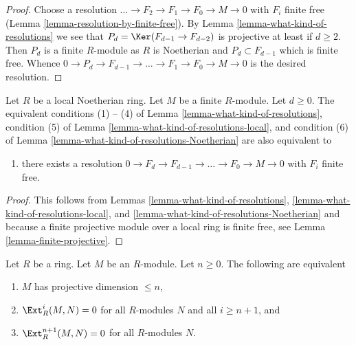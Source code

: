 \begin{proof}
Choose a resolution $\ldots \to F_2 \to F_1 \to F_0 \to M \to 0$
with $F_i$ finite free (Lemma \ref{lemma-resolution-by-finite-free}).
By Lemma \ref{lemma-what-kind-of-resolutions} we see that
$P_d = \Ker(F_{d - 1} \to F_{d - 2})$ is projective at least if $d \geq 2$.
Then $P_d$ is a finite $R$-module as $R$ is Noetherian and
$P_d \subset F_{d - 1}$ which is finite free.
Whence $0 \to P_d \to F_{d - 1} \to \ldots \to F_1 \to F_0 \to M \to 0$
is the desired resolution.
\end{proof}

\begin{lemma}
\label{lemma-what-kind-of-resolutions-Noetherian-local}
Let $R$ be a local Noetherian ring. Let $M$ be a finite $R$-module.
Let $d \geq 0$. The equivalent conditions (1) -- (4) of
Lemma \ref{lemma-what-kind-of-resolutions},
condition (5) of Lemma \ref{lemma-what-kind-of-resolutions-local},
and condition (6) of Lemma \ref{lemma-what-kind-of-resolutions-Noetherian}
are also equivalent to
\begin{enumerate}
\item[(7)] there exists a resolution
$0 \to F_d \to F_{d - 1} \to \ldots \to F_0 \to M \to 0$
with $F_i$ finite free.
\end{enumerate}
\end{lemma}

\begin{proof}
This follows from Lemmas \ref{lemma-what-kind-of-resolutions},
\ref{lemma-what-kind-of-resolutions-local}, and
\ref{lemma-what-kind-of-resolutions-Noetherian}
and because a finite projective module over a local ring
is finite free, see Lemma \ref{lemma-finite-projective}.
\end{proof}

\begin{lemma}
\label{lemma-projective-dimension-ext}
Let $R$ be a ring. Let $M$ be an $R$-module. Let $n \geq 0$.
The following are equivalent
\begin{enumerate}
\item $M$ has projective dimension $\leq n$,
\item $\Ext^i_R(M, N) = 0$ for all $R$-modules $N$ and all
$i \geq n + 1$, and
\item $\Ext^{n + 1}_R(M, N) = 0$ for all $R$-modules $N$.
\end{enumerate}
\end{lemma}

